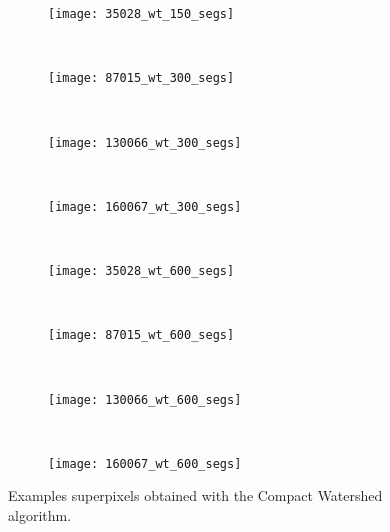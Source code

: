 \begin{figure}[!ht]
    \begin{subfigure}[t]{\textwidth+20pt\relax}
    	\texttt{[image: 35028\_wt\_150\_segs]} 
    \end{subfigure}      
    ~ %
    \begin{subfigure}[b]{0.2\textwidth}
        \texttt{[image: 87015\_wt\_300\_segs]}
    \end{subfigure}
    ~ %
    \begin{subfigure}[b]{0.2\textwidth}
        \texttt{[image: 130066\_wt\_300\_segs]}
    \end{subfigure}
    ~ %
    \begin{subfigure}[b]{0.2\textwidth}
        \texttt{[image: 160067\_wt\_300\_segs]}
    \end{subfigure} \\ [2ex]
    
    \begin{subfigure}[t]{\textwidth+20pt\relax}
    	\texttt{[image: 35028\_wt\_600\_segs]} 
    \end{subfigure}      
    ~ %
    \begin{subfigure}[b]{0.2\textwidth}
        \texttt{[image: 87015\_wt\_600\_segs]}
    \end{subfigure}
    ~ %
    \begin{subfigure}[b]{0.2\textwidth}
        \texttt{[image: 130066\_wt\_600\_segs]}
    \end{subfigure}
    ~ %
    \begin{subfigure}[b]{0.2\textwidth}
        \texttt{[image: 160067\_wt\_600\_segs]}
    \end{subfigure}     

	\caption{Examples superpixels obtained with the Compact Watershed algorithm.}\label{fig:wt_suprepixels}    
\end{figure}


